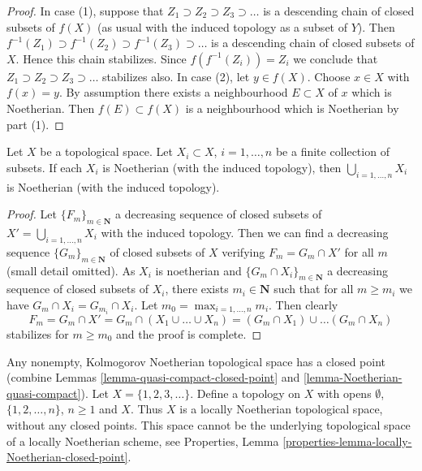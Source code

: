 \begin{proof}
In case (1), suppose that $Z_1 \supset Z_2 \supset Z_3 \supset \ldots$
is a descending chain of closed subsets of $f(X)$ (as usual with the induced
topology as a subset of $Y$). Then
$f^{-1}(Z_1) \supset f^{-1}(Z_2) \supset f^{-1}(Z_3) \supset \ldots$ is
a descending chain of closed subsets of $X$. Hence this chain stabilizes.
Since $f(f^{-1}(Z_i)) = Z_i$ we conclude that
$Z_1 \supset Z_2 \supset Z_3 \supset \ldots$
stabilizes also. In case (2), let $y \in f(X)$. Choose $x \in X$ with
$f(x) = y$. By assumption there exists a neighbourhood $E \subset X$ of
$x$ which is Noetherian. Then $f(E) \subset f(X)$ is a neighbourhood
which is Noetherian by part (1).
\end{proof}

\begin{lemma}
\label{lemma-finite-union-Noetherian}
Let $X$ be a topological space.
Let $X_i \subset X$, $i = 1, \ldots, n$ be a finite collection of subsets.
If each $X_i$ is Noetherian (with the induced topology), then
$\bigcup_{i = 1, \ldots, n}  X_i$ is Noetherian (with the induced topology).
\end{lemma}

\begin{proof}
Let $\{F_m\}_{m \in \mathbf{N}}$ a decreasing sequence of closed subsets
of $X' = \bigcup_{i = 1, \ldots, n}  X_i$ with the induced topology.
Then we can find a decreasing sequence $\{G_m\}_{m \in \mathbf{N}}$
of closed subsets of $X$ verifying $F_m = G_m \cap X'$ for all $m$
(small detail omitted). As $X_i$ is noetherian and
$\{G_m \cap X_i\}_{m \in \mathbf{N}}$ a decreasing sequence
of closed subsets of $X_i$, there exists $m_i \in \mathbf{N}$
such that for all $m \geq m_i$ we have $G_m \cap X_i = G_{m_i} \cap X_i$.
Let $m_0 = \max_{i = 1, \ldots, n} m_i$. Then clearly
$$
F_m = G_m \cap X' = G_m \cap (X_1 \cup \ldots \cup X_n) =
(G_m \cap X_1) \cup \ldots (G_m \cap X_n)
$$
stabilizes for $m \geq m_0$ and the proof is complete.
\end{proof}

\begin{example}
\label{example-locally-Noetherian-no-closed-point}
Any nonempty, Kolmogorov Noetherian topological space has a closed point
(combine Lemmas \ref{lemma-quasi-compact-closed-point} and
\ref{lemma-Noetherian-quasi-compact}).
Let $X = \{1, 2, 3, \ldots \}$. Define a topology on $X$
with opens $\emptyset$, $\{1, 2, \ldots, n\}$, $n \geq 1$
and $X$. Thus $X$ is a locally Noetherian topological space,
without any closed points. This space cannot be the underlying
topological space of a locally Noetherian scheme, see
Properties, Lemma \ref{properties-lemma-locally-Noetherian-closed-point}.
\end{example}

